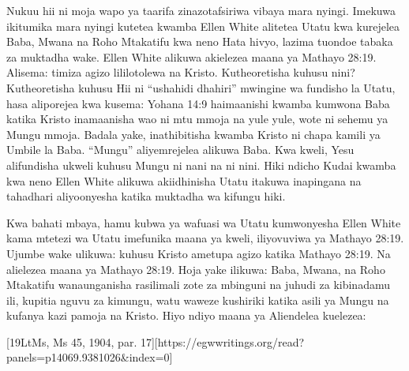 Nukuu hii ni moja wapo ya taarifa zinazotafsiriwa vibaya mara nyingi. Imekuwa ikitumika mara nyingi kutetea kwamba Ellen White alitetea Utatu kwa kurejelea Baba, Mwana na Roho Mtakatifu kwa neno  Hata hivyo, lazima tuondoe tabaka za muktadha wake. Ellen White alikuwa akielezea maana ya Mathayo 28:19. Alisema:  timiza agizo lililotolewa na Kristo. Kutheoretisha kuhusu nini? Kutheoretisha kuhusu  Hii ni “ushahidi dhahiri” mwingine wa fundisho la Utatu, hasa aliporejea  kwa kusema:  Yohana 14:9 haimaanishi kwamba kumwona Baba katika Kristo inamaanisha wao ni mtu mmoja na yule yule, wote ni sehemu ya Mungu mmoja. Badala yake, inathibitisha kwamba Kristo ni chapa kamili ya Umbile la Baba. “Mungu” aliyemrejelea alikuwa Baba. Kwa kweli, Yesu alifundisha ukweli kuhusu Mungu ni nani na ni nini. Hiki ndicho   Kudai kwamba kwa neno  Ellen White alikuwa akiidhinisha Utatu itakuwa inapingana na tahadhari aliyoonyesha katika muktadha wa kifungu hiki.

Kwa bahati mbaya, hamu kubwa ya wafuasi wa Utatu kumwonyesha Ellen White kama mtetezi wa Utatu imefunika maana ya kweli, iliyovuviwa ya Mathayo 28:19. Ujumbe wake ulikuwa:  kuhusu  Kristo ametupa agizo katika Mathayo 28:19. Na alielezea maana ya Mathayo 28:19. Hoja yake ilikuwa: Baba, Mwana, na Roho Mtakatifu wanaunganisha rasilimali zote za mbinguni na juhudi za kibinadamu ili, kupitia nguvu za kimungu, watu waweze kushiriki katika asili ya Mungu na kufanya kazi pamoja na Kristo. Hiyo ndiyo maana ya  Aliendelea kuelezea:

[19LtMs, Ms 45, 1904, par. 17][https://egwwritings.org/read?panels=p14069.9381026&index=0]

